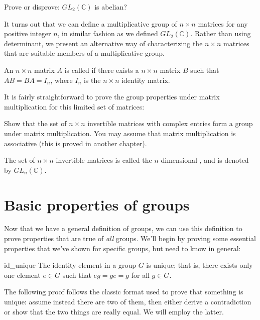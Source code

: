 \begin{exercise}{}
Prove or disprove: $GL_2(\mathbb C)$ is abelian?
\end{exercise}

It turns out that we can define a multiplicative group of $n \times n$ matrices for any positive integer $n$, in similar fashion as we defined $GL_2(\mathbb{C})$.  Rather than using determinant, we present an alternative way of characterizing the $n \times n$ matrices that are suitable members of a multiplicative group.

\begin{defn} 
An $n \times n$ matrix $A$ is called  if there exists a $n \times n$ matrix $B$ such that $AB = BA = I_n$, where $I_n$ is the $n \times n$ identity matrix.
\end{defn}

It is fairly straightforward to prove the group properties under matrix multiplication for this limited set of matrices:

\begin{exercise}{} 
Show that the set of  $n \times n$  invertible matrices with complex entries form a group under matrix multiplication.  You may assume that
matrix multiplication is associative (this is proved  in another chapter). 
\end{exercise}

\begin{defn} 
The set of $n \times n$ invertible matrices is called the $n$ dimensional , and is denoted by $GL_n(\mathbb{C})$.
\end{defn}


\section{Basic properties of groups}\label{Basic properties of groups}
 
Now that we have a general definition of groups, we can use this definition to prove properties that are true of \emph{all} groups. We'll begin by proving some essential properties that we've shown for specific groups, but need to know in general:

\begin{prop}{id_unique}
The identity element in a group $G$ is unique; that is, there exists
only one element $e \in G$ such that $eg = ge = g$ for all $g \in G$. 
\end{prop}
 
\begin{rem}
The following proof follows the classic format used to prove that something is unique: assume instead there are two of them, then either derive a contradiction or show that the two things are really equal.  We will employ the latter.
\end{rem}
 
